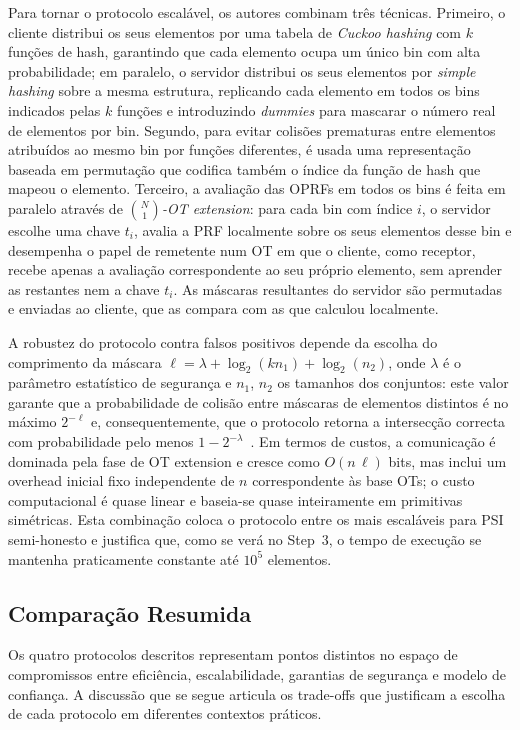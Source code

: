 Para tornar o protocolo escalável, os autores combinam três técnicas. Primeiro, o cliente distribui os seus elementos por uma tabela de \emph{Cuckoo hashing} com $k$ funções de hash, garantindo que cada elemento ocupa um único bin com alta probabilidade; em paralelo, o servidor distribui os seus elementos por \emph{simple hashing} sobre a mesma estrutura, replicando cada elemento em todos os bins indicados pelas $k$ funções e introduzindo \emph{dummies} para mascarar o número real de elementos por bin. Segundo, para evitar colisões prematuras entre elementos atribuídos ao mesmo bin por funções diferentes, é usada uma representação baseada em permutação que codifica também o índice da função de hash que mapeou o elemento. Terceiro, a avaliação das OPRFs em todos os bins é feita em paralelo através de \emph{$\binom{N}{1}$-OT extension}: para cada bin com índice $i$, o servidor escolhe uma chave $t_i$, avalia a PRF localmente sobre os seus elementos desse bin e desempenha o papel de remetente num OT em que o cliente, como receptor, recebe apenas a avaliação correspondente ao seu próprio elemento, sem aprender as restantes nem a chave $t_i$. As máscaras resultantes do servidor são permutadas e enviadas ao cliente, que as compara com as que calculou localmente.

A robustez do protocolo contra falsos positivos depende da escolha do comprimento da máscara $\ell = \lambda + \log_2(kn_1) + \log_2(n_2)$, onde $\lambda$ é o parâmetro estatístico de segurança e $n_1$, $n_2$ os tamanhos dos conjuntos: este valor garante que a probabilidade de colisão entre máscaras de elementos distintos é no máximo $2^{-\ell}$ e, consequentemente, que o protocolo retorna a intersecção correcta com probabilidade pelo menos $1 - 2^{-\lambda}$~\cite{pinkas2016scalable}. Em termos de custos, a comunicação é dominada pela fase de OT extension e cresce como $O(n\,\ell)$ bits, mas inclui um overhead inicial fixo independente de $n$ correspondente às base OTs; o custo computacional é quase linear e baseia-se quase inteiramente em primitivas simétricas. Esta combinação coloca o protocolo entre os mais escaláveis para PSI semi-honesto e justifica que, como se verá no Step~3, o tempo de execução se mantenha praticamente constante até $10^5$ elementos.

\subsection{Comparação Resumida}
\label{sec:comparacao}

Os quatro protocolos descritos representam pontos distintos no espaço de compromissos entre eficiência, escalabilidade, garantias de segurança e modelo de confiança. A discussão que se segue articula os trade-offs que justificam a escolha de cada protocolo em diferentes contextos práticos.

